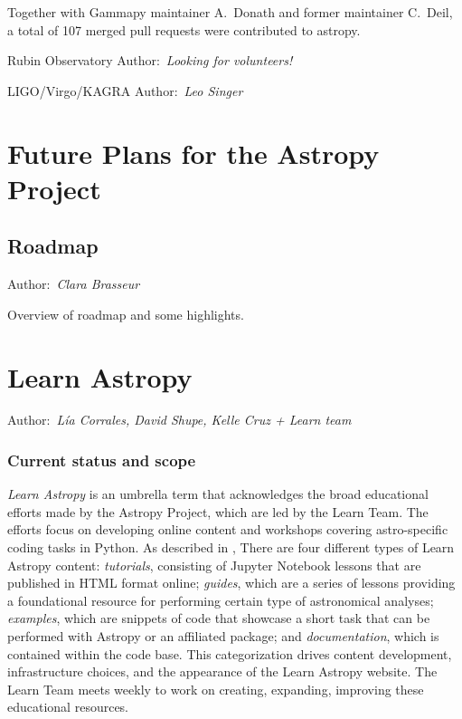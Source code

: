 \documentclass[modern]{aastex631}
\newcommand{\secauthor}[1]{{\color{blue}Author:~\textit{#1}}}
\newcommand{\secunfilled}{{\color{red}Author:~\textit{Looking for volunteers!}}}
\begin{document}
Together with Gammapy maintainer A.~Donath and former maintainer C.~Deil,
a total of 107 merged pull requests were contributed to astropy.


Rubin Observatory
\secunfilled

LIGO/Virgo/KAGRA
\secauthor{Leo Singer}
\section{Future Plans for the Astropy Project} \label{sec:future}

\subsection{Roadmap}

\secauthor{Clara Brasseur}

Overview of roadmap and some highlights.

\section{Learn Astropy} \label{sec:learn}

\secauthor{Lía Corrales, David Shupe, Kelle Cruz + Learn team}

\subsubsection{Current status and scope}

{\it Learn Astropy} is an umbrella term that acknowledges the broad educational
efforts made by the Astropy Project, which are led by the Learn Team.
The efforts focus on developing online content and workshops covering
astro-specific coding tasks in Python.
As described in \citet{astropy:2018}, There are four different types of
Learn Astropy content: \textit{tutorials}, consisting of Jupyter Notebook
lessons that are published in HTML format online; \textit{guides}, which are a
series of lessons providing a foundational resource for performing certain
type of astronomical analyses; \textit{examples}, which are snippets of code
that showcase a short task that can be performed with Astropy or an affiliated
package; and \textit{documentation}, which is contained within the code base.
This categorization drives content development, infrastructure choices, and the
appearance of the Learn Astropy website.
The Learn Team meets weekly to work on creating, expanding, improving these
educational resources.
\end{document}
